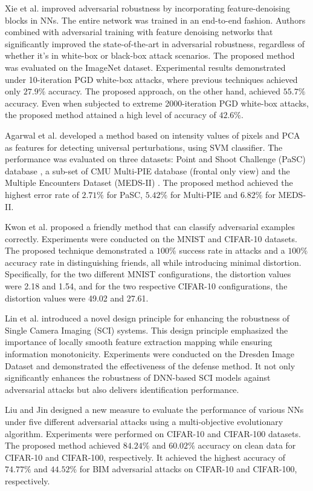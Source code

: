 \documentclass[sn-mathphys]{sn-jnl}%
\theoremstyle{thmstyleone}%
\theoremstyle{thmstyletwo}%
\theoremstyle{thmstylethree}%
\begin{document}
Xie et al. \cite{xie2019feature} improved adversarial robustness by incorporating feature-denoising blocks in NNs. The entire network was trained in an end-to-end fashion. Authors combined with adversarial training with feature denoising networks that significantly improved the state-of-the-art in adversarial robustness, regardless of whether it's in white-box or black-box attack scenarios. The proposed method was evaluated on the ImageNet dataset. Experimental results demonstrated under 10-iteration PGD white-box attacks, where previous techniques achieved only $27.9\%$ accuracy. The proposed approach, on the other hand, achieved $55.7\%$ accuracy. Even when subjected to extreme 2000-iteration PGD white-box attacks, the proposed method attained a high level of accuracy of $42.6\%$. 

Agarwal et al. \cite{agarwal2018image} developed a method based on intensity values of pixels and PCA as features for detecting universal perturbations, using SVM classifier. The performance was evaluated on three datasets: Point and Shoot Challenge (PaSC) database \cite{pasc}, a sub-set of CMU Multi-PIE database \cite{multi} (frontal only view) and the Multiple Encounters Dataset (MEDS-II) \cite{meds}. The proposed method achieved the highest error rate of $2.71\%$ for PaSC, $5.42\%$ for Multi-PIE and $6.82\%$ for MEDS-II.    

Kwon et al. \cite{Hyun2018} proposed a friendly method that can classify adversarial examples correctly. Experiments were conducted on the MNIST and CIFAR-10 datasets. The proposed technique demonstrated a $100\%$ success rate in attacks and a $100\%$ accuracy rate in distinguishing friends, all while introducing minimal distortion. Specifically, for the two different MNIST configurations, the distortion values were 2.18 and 1.54, and for the two respective CIFAR-10 configurations, the distortion values were 49.02 and 27.61.

Lin et al. \cite{Lin2021} introduced a novel design principle for enhancing the robustness of Single Camera Imaging (SCI) systems. This design principle emphasized the importance of locally smooth feature extraction mapping while ensuring information monotonicity. Experiments were conducted on the Dresden Image Dataset and demonstrated the effectiveness of the defense method. It not only significantly enhances the robustness of DNN-based SCI models against adversarial attacks but also delivers identification performance.

Liu and Jin \cite{Liu2021} designed a new measure to evaluate the performance of various NNs under five different adversarial attacks using a multi-objective evolutionary algorithm. Experiments were performed on CIFAR-10 and CIFAR-100 datasets. The proposed method achieved $84.24\%$ and $60.02\%$ accuracy on clean data for CIFAR-10 and CIFAR-100, respectively. It achieved the highest accuracy of $74.77\%$ and $44.52\%$ for BIM adversarial attacks on CIFAR-10 and CIFAR-100, respectively.
\end{document}
